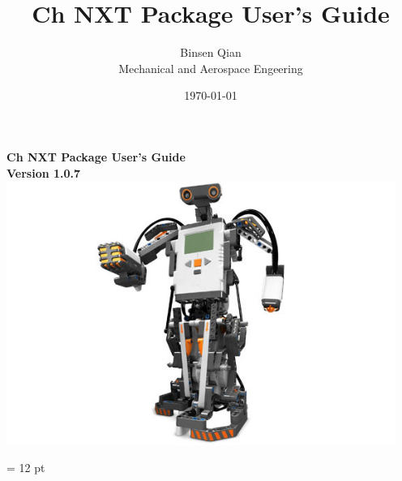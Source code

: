\documentclass[11pt]{article}
\title{Ch NXT Package User's Guide}
\author{Binsen Qian\\Mechanical and Aerospace Engeering}
\date{\today}
\begin{document}
\begin{titlepage}
\begin{center}
\vspace*{2cm}
{\Huge\sf\bf Ch NXT Package User's Guide}\\
\vspace*{2cm}
{\bf Version 1.0.7}\\
\vspace*{4cm}
\includegraphics[width = 5in]{figure/mindstorm/NXT_humanoid.png}
\end{center}
\end{titlepage}

\newpage
{}
\tableofcontents
\newpage

\baselineskip = 12 pt

\end{document}
